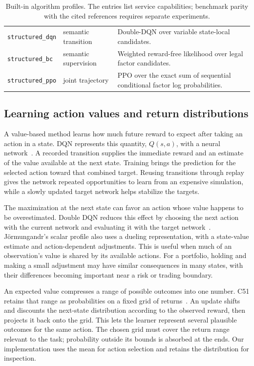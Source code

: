 \documentclass{strategynet-journal}
\begin{document}
\begin{table}[H]
\begin{tabularx}{\textwidth}{@{}P{0.13\textwidth}P{0.18\textwidth}X@{}}
\texttt{structured\_dqn} & semantic transition & Double-DQN over variable state-local candidates. \\
\texttt{structured\_bc} & semantic supervision & Weighted reward-free likelihood over legal factor candidates. \\
\texttt{structured\_ppo} & joint trajectory & PPO over the exact sum of sequential conditional factor log probabilities. \\
\bottomrule
\end{tabularx}
\caption{Built-in algorithm profiles.  The entries list service capabilities;
benchmark parity with the cited references requires separate experiments.}
\label{tab:algorithms}
\end{table}

\subsection{Learning action values and return distributions}

A value-based method learns how much future reward to expect after taking an
action in a state. DQN represents this quantity, $Q(s,a)$, with a neural
network~\cite{dqn}. A recorded transition supplies the immediate reward and
an estimate of the value available at the next state. Training brings the
prediction for the selected action toward that combined target. Reusing
transitions through replay gives the network repeated opportunities to learn
from an expensive simulation, while a slowly updated target network helps
stabilize the targets.

The maximization at the next state can favor an action whose value happens
to be overestimated. Double DQN reduces this effect by choosing the next
action with the current network and evaluating it with the target
network~\cite{doubleq}. Jörmungandr's scalar profile also uses a dueling
representation, with a state-value estimate and action-dependent adjustments.
This is useful when much of an observation's value is shared by its available
actions. For a portfolio, holding and making a small adjustment may have similar
consequences in many states, with their differences becoming important near
a risk or trading boundary.

An expected value compresses a range of possible outcomes into one number.
C51 retains that range as probabilities on a fixed grid of returns~\cite{c51}.
An update shifts and discounts the next-state distribution according to the
observed reward, then projects it back onto the grid. This lets the learner
represent several plausible outcomes for the same action. The chosen grid
must cover the return range relevant to the task; probability outside its
bounds is absorbed at the ends. Our implementation uses the mean for action
selection and retains the distribution for inspection.
\end{document}
